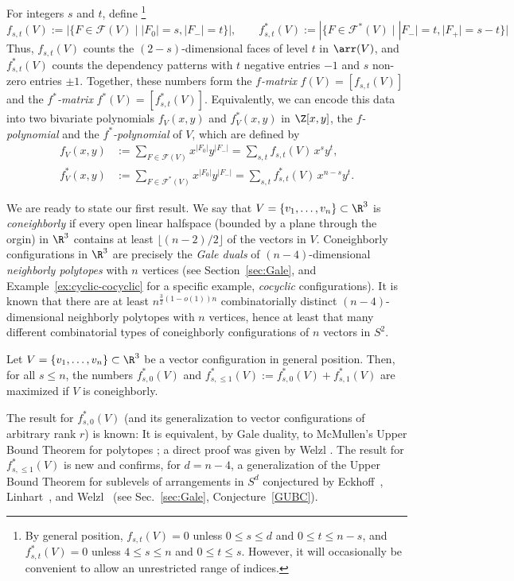 \begin{definition}[$f$ and $f^*$]
\label{def:f-poly}
For integers $s$ and $t$, define%
\footnote{By general position, $f_{s,t}(V)=0$ unless $0\leq s\leq d$ and $0\leq t\leq n-s$, and 
$f^*_{s,t}(V)=0$ unless $4\leq s \leq n$ and $0\leq t\leq s$. However, it will occasionally be convenient to allow an unrestricted range of indices.}
$$
f_{s,t}(V):=|\{F\in \mathcal{F}(V)\mid |F_0|=s,|F_-|=t\}|, \qquad f^*_{s,t}(V):=|\{F\in \mathcal{F}^*(V)\mid |F_-|=t, |F_+|=s-t\}|
$$
Thus, $f_{s,t}(V)$ counts the $(2-s)$-dimensional faces of level $t$ in $\arr(V)$, and $f^*_{s,t}(V)$ counts the dependency patterns with $t$ negative entries $-1$ and $s$ non-zero entries $\pm 1$.
%
Together, these numbers form the \emph{$f$-matrix} $f(V)=[f_{s,t}(V)]$ and the \emph{$f^*$-matrix} $f^*(V)=[f^*_{s,t}(V)]$. Equivalently, we can encode this data into two bivariate polynomials
$f_V(x,y)$ and $f^*_V(x,y)$ in $\Z[x,y]$, the \emph{$f$-polynomial} and the \emph{$f^*$-polynomial} of $V$, which are defined by 
\begin{align*} 
f_{V}(x,y) & :=  \sum_{F\in \mathcal{F}(V)} x^{|F_0|} y^{|F_-|} = \sum_{s,t} f_{s,t}(V)\, x^s y^t,\\
f^*_{V}(x,y) &:= \sum_{F\in \mathcal{F}^*(V)} x^{|F_0|} y^{|F_-|} = \sum_{s,t} f^*_{s,t}(V)\, x^{n-s} y^t.
\end{align*}
\end{definition}
We are ready to state our first result. We say that $V = \{ v_1, \ldots, v_n \} \subset \R^3$ is \emph{coneighborly} if every open linear halfspace (bounded by a plane through the orgin) in $\R^3$ contains at least $\lfloor (n-2)/2 \rfloor$ of the vectors in $V$. Coneighborly configurations in $\R^3$ are precisely the \emph{Gale duals} of $(n-4)$-dimensional \emph{neighborly polytopes} with $n$ vertices (see Section~\ref{sec:Gale}, and Example~\ref{ex:cyclic-cocyclic} for a specific example, \emph{cocyclic} configurations). It is known \cite{Padrol:2013aa} that there are at least $n^{\frac{3}{2}(1-o(1))n}$ combinatorially distinct $(n-4)$-dimensional neighborly polytopes with $n$ vertices, hence at least that many different combinatorial types of 
coneighborly configurations of $n$ vectors in $S^2$. 
\begin{theorem} 
\label{thm:GUBT-fstar}
Let $V = \{ v_1, \ldots, v_n \} \subset \R^3$ be a vector configuration in general position. Then, for all $s\leq n$, the numbers $f^*_{s,0}(V)$ and $f^*_{s,\leq 1}(V):=f^*_{s,0}(V)+f^*_{s,1}(V)$ are maximized if $V$ is coneighborly.
\end{theorem}
The result for $f^*_{s,0}(V)$ (and its generalization to vector configurations of arbitrary rank $r$) is known: It is equivalent, by Gale duality, to McMullen's Upper Bound Theorem for polytopes \cite{McMullen:1970aa}; a direct proof was given by Welzl \cite{Welzl:2001aa}. The result for $f^*_{s,\leq 1}(V)$ is new and confirms, for $d=n-4$, a generalization of the Upper Bound Theorem for sublevels of arrangements in $S^d$ conjectured by Eckhoff~\cite{Eckhoff:1993aa}, Linhart~\cite{Linhart:1994aa}, and Welzl~\cite{Welzl:2001aa} (see Sec.~\ref{sec:Gale}, Conjecture~\ref{GUBC}). 
%
